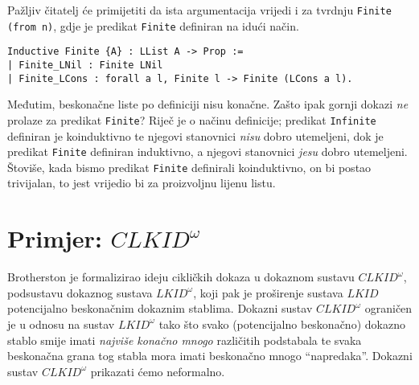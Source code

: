 Pažljiv čitatelj će primijetiti da ista argumentacija vrijedi
i za tvrdnju \texttt{Finite (from n)}, gdje je predikat \texttt{Finite} definiran na idući način.
\begin{verbatim}
Inductive Finite {A} : LList A -> Prop :=
| Finite_LNil : Finite LNil
| Finite_LCons : forall a l, Finite l -> Finite (LCons a l).
\end{verbatim}
\noindent Međutim, beskonačne liste po definiciji nisu konačne.
Zašto ipak gornji dokazi \textit{ne} prolaze za predikat \texttt{Finite}?
Riječ je o načinu definicije; predikat \texttt{Infinite} definiran je koinduktivno
te njegovi stanovnici \textit{nisu} dobro utemeljeni,
dok je predikat \texttt{Finite} definiran induktivno, a njegovi stanovnici \textit{jesu}
dobro utemeljeni. Štoviše, kada bismo predikat \texttt{Finite} definirali koinduktivno,
on bi postao trivijalan, to jest vrijedio bi za proizvoljnu lijenu listu.

\section{Primjer: \(\mathit{CLKID}^{\omega}\)}
Brotherston je formalizirao ideju cikličkih dokaza u dokaznom sustavu
\(\mathit{CLKID}^{\omega}\), podsustavu dokaznog sustava \(\mathit{LKID}^{\omega}\),
koji pak je proširenje sustava \(\mathit{LKID}\) potencijalno beskonačnim dokaznim stablima.
Dokazni sustav \(\mathit{CLKID}^{\omega}\) ograničen je u odnosu na sustav \(\mathit{LKID}^{\omega}\)
tako što svako (potencijalno beskonačno) dokazno stablo
smije imati \textit{najviše konačno mnogo} različitih podstabala te
svaka beskonačna grana tog stabla mora imati beskonačno mnogo \enquote{napredaka}.
Dokazni sustav \(\mathit{CLKID}^{\omega}\) prikazati ćemo neformalno.

